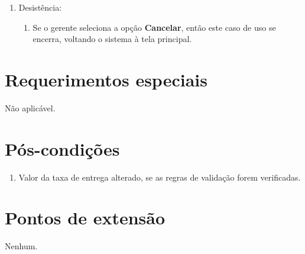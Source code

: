 \begin{enumerate}
	\item Desistência:
	\begin{enumerate}
		\item Se o gerente seleciona a opção \textbf{Cancelar}, então este caso de uso se encerra, voltando o sistema à tela principal.
	\end{enumerate}
\end{enumerate}

\section{Requerimentos especiais}

Não aplicável.

\section{Pós-condições}

\begin{enumerate}
	\item Valor da taxa de entrega alterado, se as regras de validação forem verificadas.
\end{enumerate}

\section{Pontos de extensão}

Nenhum.